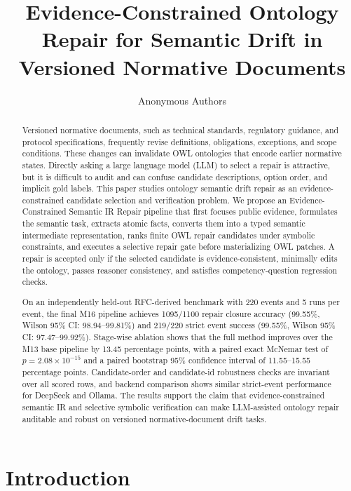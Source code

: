 \documentclass[11pt]{article}
\title{Evidence-Constrained Ontology Repair for Semantic Drift in Versioned Normative Documents}
\author{Anonymous Authors}
\date{}
\begin{document}
\maketitle

\begin{abstract}
Versioned normative documents, such as technical standards, regulatory guidance, and protocol specifications, frequently revise definitions, obligations, exceptions, and scope conditions. These changes can invalidate OWL ontologies that encode earlier normative states. Directly asking a large language model (LLM) to select a repair is attractive, but it is difficult to audit and can confuse candidate descriptions, option order, and implicit gold labels. This paper studies ontology semantic drift repair as an evidence-constrained candidate selection and verification problem. We propose an Evidence-Constrained Semantic IR Repair pipeline that first focuses public evidence, formulates the semantic task, extracts atomic facts, converts them into a typed semantic intermediate representation, ranks finite OWL repair candidates under symbolic constraints, and executes a selective repair gate before materializing OWL patches. A repair is accepted only if the selected candidate is evidence-consistent, minimally edits the ontology, passes reasoner consistency, and satisfies competency-question regression checks.

On an independently held-out RFC-derived benchmark with 220 events and 5 runs per event, the final M16 pipeline achieves 1095/1100 repair closure accuracy (99.55\%, Wilson 95\% CI: 98.94--99.81\%) and 219/220 strict event success (99.55\%, Wilson 95\% CI: 97.47--99.92\%). Stage-wise ablation shows that the full method improves over the M13 base pipeline by 13.45 percentage points, with a paired exact McNemar test of $p=2.08\times10^{-15}$ and a paired bootstrap 95\% confidence interval of 11.55--15.55 percentage points. Candidate-order and candidate-id robustness checks are invariant over all scored rows, and backend comparison shows similar strict-event performance for DeepSeek and Ollama. The results support the claim that evidence-constrained semantic IR and selective symbolic verification can make LLM-assisted ontology repair auditable and robust on versioned normative-document drift tasks.
\end{abstract}

\section{Introduction}
\end{document}
